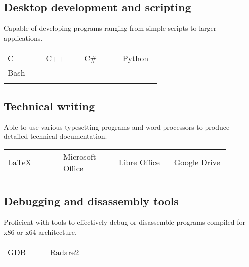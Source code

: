 \documentclass[letterpaper]{article}
\begin{document}
        \subsection*{Desktop development and scripting}

        Capable of developing programs ranging from simple scripts to larger applications.

        \begin{center}
        \begin{tabular}{p{0.22\linewidth} p{0.22\linewidth} p{0.22\linewidth} p{0.22\linewidth}}
            \\
            C & C++ & C\# & Python \\
            Bash &&&\\
            \\
        \end{tabular}
        \end{center}

        \subsection*{Technical writing}

        Able to use various typesetting programs and word processors to produce detailed technical documentation.

        \begin{center}
        \begin{tabular}{p{0.22\linewidth} p{0.22\linewidth} p{0.22\linewidth} p{0.22\linewidth}}
            \\
            LaTeX & Microsoft Office & Libre Office & Google Drive \\
            \\
        \end{tabular}
        \end{center}

        \subsection*{Debugging and disassembly tools}
        Proficient with tools to effectively debug or disassemble programs compiled for x86 or x64 architecture.

        \begin{center}
        \begin{tabular}{p{0.22\linewidth} p{0.22\linewidth} p{0.22\linewidth} p{0.22\linewidth}}
            \\
            GDB & Radare2 &&\\
            \\
        \end{tabular}
        \end{center}
\end{document}
